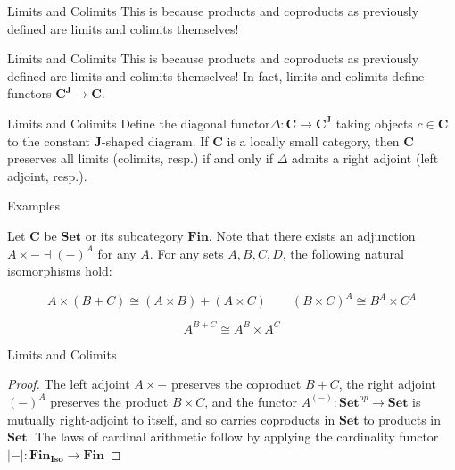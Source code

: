 \documentclass[tikz]{beamer}
\theoremstyle{definition}
\newcommand{\cat}[1]{\mathbf{#1}}
\begin{document}
\begin{frame}{Limits and Colimits}
This is because products and coproducts as previously defined are limits and colimits themselves!
\end{frame}

\begin{frame}{Limits and Colimits}
This is because products and coproducts as previously defined are limits and colimits themselves! In fact, limits and colimits define functors $\cat{C}^{\cat{J}} \to \cat{C}$. 
\end{frame}


\begin{frame}{Limits and Colimits}
Define the diagonal functor$ \Delta : \cat{C} \to \cat{C}^{\cat{J}}$ taking objects $c \in \cat{C}$ to the constant $\cat{J}$-shaped diagram. If $\cat{C}$ is a locally small category, then $\cat{C}$ preserves all limits (colimits, resp.) if and only if $\Delta$ admits a right adjoint (left adjoint, resp.). 
\end{frame}

\begin{frame}{Examples}

Let $\cat{C}$ be $\cat{Set}$ or its subcategory $\cat{Fin}$. Note that there exists an adjunction $A \times - \dashv (-)^A$ for any $A$. For any sets $A, B, C, D$, the following natural isomorphisms hold: 

\begin{center}
\begin{equation*}
A \times (B + C) \cong (A \times B) + (A \times C) \qquad (B \times C)^A \cong B^A \times C^A
\end{equation*}

\begin{equation*}
A^{B + C} \cong A^B \times A^C
\end{equation*}
\end{center}


\end{frame}

\begin{frame}{Limits and Colimits}
\begin{proof}
The left adjoint $A \times -$ preserves the coproduct $B + C$, the right adjoint $(-)^A$ preserves the product $B \times C$, and the functor $A^{(-)}: \cat{Set}^{op} \to \cat{Set}$ is mutually right-adjoint to itself, and so carries coproducts in $\cat{Set}$ to products in $\cat{Set}$. The laws of cardinal arithmetic follow by applying the cardinality functor $|-|: \cat{Fin_{Iso}} \to \cat{Fin}$

\end{proof}
\end{frame}
\end{document}
